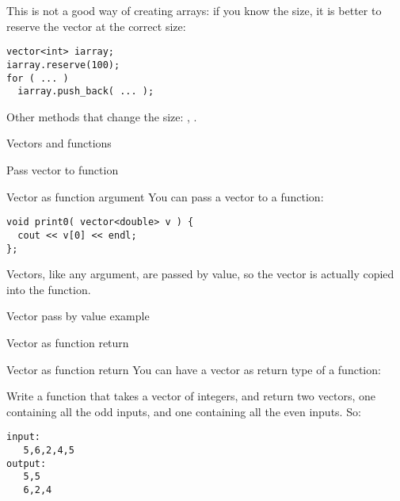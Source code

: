 This is not a good way of creating arrays: if you know the size, it is
better to reserve the vector at the correct size:
\begin{verbatim}
vector<int> iarray;
iarray.reserve(100);
for ( ... )
  iarray.push_back( ... );
\end{verbatim}

Other methods that change the size: , .

 {Vectors and functions}

 {Pass vector to function}

\begin{block}{Vector as function argument}
  \label{sl:vector-arg}
  You can pass a vector to a function:
\begin{verbatim}
void print0( vector<double> v ) {
  cout << v[0] << endl;
};
\end{verbatim}
Vectors, like any argument, are passed by value, so the vector is
actually copied into the function.
\end{block}

\begin{block}{Vector pass by value example}
  \label{sl:vector-arg-ex}
\end{block}

 {Vector as function return}

\begin{block}{Vector as function return}
  \label{sl:vector-return}
  You can have a vector as return type of a function:
\end{block}

\begin{exercise}
  \label{ex:splitoddeven}
  Write a function that takes a vector of integers, and return two
  vectors, one containing all the odd inputs, and one containing all
  the even inputs. So:
\begin{verbatim}
input:
   5,6,2,4,5
output:
   5,5
   6,2,4
\end{verbatim}
\end{exercise}

\begin{comment}
  \begin{exercise}
    \label{ex:vectorconcat}
    Write a function that accepts a vector of ints, and returns a vector
    that contains the input, concatenated with itself. So:
\begin{verbatim}
Input: (1,2,3)
Output: (1,2,3,1,2,3)
\end{verbatim}
  \end{exercise}
\end{comment}


